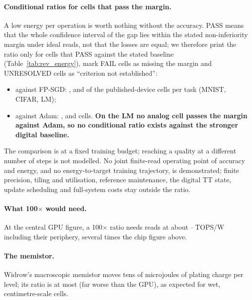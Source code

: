 \paragraph{Conditional ratios for cells that pass the margin.} A low energy per operation is worth nothing without the
accuracy. PASS means that the whole confidence interval of the gap lies within the stated non-inferiority margin under ideal reads,
not that the losses are equal; we therefore print the ratio only for cells that PASS against the stated baseline
(Table~\ref{tab:rev_energy}), mark FAIL cells as missing the margin and UNRESOLVED cells as ``criterion not established'':
\begin{itemize}
\item against FP-SGD: \RVenEqFpMnistN, \RVenEqFpCifarN{} and \RVenEqFpLmN{} of the \RVenCellsMnistN{} published-device cells per
      task (MNIST, CIFAR, LM);
\item against Adam: \RVenEqAdamMnistN, \RVenEqAdamCifarN{} and \RVenEqAdamLmN{} cells. \textbf{On the LM no analog cell passes
      the margin against Adam, so no conditional ratio exists against the stronger digital baseline.}
\end{itemize}
The comparison is at a fixed training budget; reaching a quality at a different number of steps is not modelled. No joint
finite-read operating point of accuracy and energy, and no energy-to-target training trajectory, is demonstrated; finite
precision, tiling and utilisation, reference maintenance, the digital TT state, update scheduling and full-system costs stay
outside the ratio.

\paragraph{What 100$\times$ would need.} At the central GPU figure, a 100$\times$ ratio needs reads at about
\RVenNeedTopsMin--\RVenNeedTopsMax\,TOPS/W including their periphery, several times the chip figure above.

\paragraph{The memistor.} Widrow's macroscopic memistor moves tens of microjoules of plating charge per level; its ratio is at
most \RVenWidrowRatioMax{} (far worse than the GPU), as expected for wet, centimetre-scale cells.


